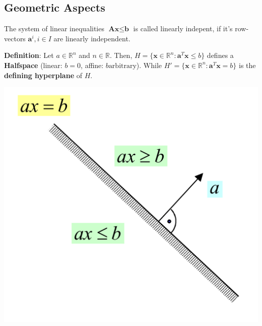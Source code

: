 \documentclass[11pt]{article}
\begin{document}
\subsection{Geometric Aspects}
The system of linear inequalities $\textbf{A}\textbf{x}\leq\textbf{b}$ is called linearly indepent, if it's row-vectors $\textbf{a}^i, i\in I$ are linearly independent.

\noindent
\begin{minipage}{0.7\linewidth}
	\textbf{Definition}: Let $a\in\mathbb{R}^n$ and $n\in\mathbb{R}$. Then, $H=\{\textbf{x}\in\mathbb{R}^n:\textbf{a}^T\textbf{x}\leq b\}$ defines a \textbf{Halfspace} (linear: $b=0$, affine: $b\text{arbitrary}$). While $H'=\{\textbf{x}\in\mathbb{R}^n:\textbf{a}^T\textbf{x}= b\}$ is the \textbf{defining hyperplane} of $H$.
\end{minipage}
\begin{minipage}{0.3\linewidth}
	\centering
	\includegraphics[width=\linewidth]{hyperplane}
\end{minipage}
\end{document}
